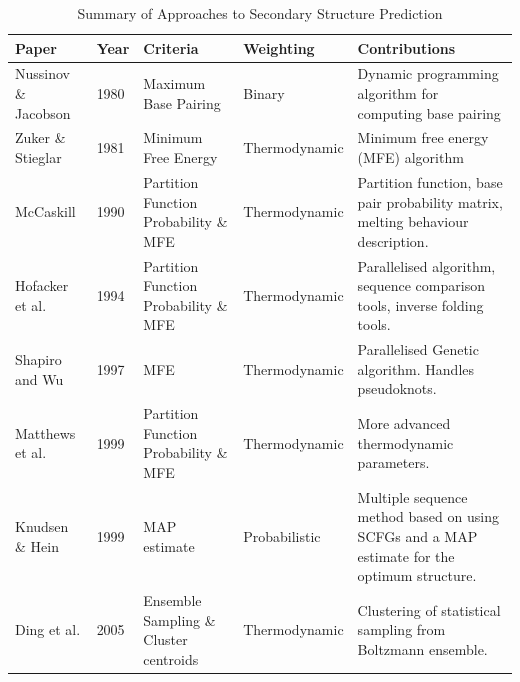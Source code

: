 \documentclass[journal]{IEEEtran}
\begin{document}
\begin{table}[t]
\centering
\caption{Summary of Approaches to Secondary Structure Prediction}
\label{my-label}
\begin{tabular}{|l|l|p{5cm}|l|p{5cm}|}
\hline
\textbf{Paper}                             & \textbf{Year} & \textbf{Criteria}                     & \textbf{Weighting} & \textbf{Contributions}                                                           \\ \hline
Nussinov \& Jacobson \cite{nussinov1980fast}           & 1980          & Maximum Base Pairing                  & Binary             & Dynamic programming algorithm for computing base pairing                                     \\ \hline
Zuker \& Stieglar \cite{zuker1981optimal} & 1981          & Minimum Free Energy                   & Thermodynamic      & Minimum free energy (MFE) algorithm                                                    \\ \hline
McCaskill \cite{mccaskill1990equilibrium}  & 1990          & Partition Function Probability \& MFE & Thermodynamic      & Partition function, base pair probability matrix, melting behaviour description. \\ \hline

Hofacker et al. \cite{hofacker1994fast}  & 1994          & Partition Function Probability \& MFE & Thermodynamic      & Parallelised algorithm, sequence comparison tools, inverse folding tools. \\ \hline

Shapiro and Wu \cite{shapiro1997predicting, shapiro1994massively} & 1997 & MFE & Thermodynamic & Parallelised Genetic algorithm. Handles pseudoknots. \\ \hline

Matthews et al. \cite{mathews1999expanded} & 1999          & Partition Function Probability \& MFE & Thermodynamic      & More advanced thermodynamic parameters. \\ \hline

Knudsen \& Hein \cite{knudsen1999rna, knudsen2003pfold} & 1999  & MAP estimate & Probabilistic & Multiple sequence method based on using SCFGs and a MAP estimate for the optimum structure. \\ \hline

Ding et al. \cite{ding2003statistical, ding2005rna} & 2005          & Ensemble Sampling \& Cluster centroids & Thermodynamic      & Clustering of statistical sampling from Boltzmann ensemble. \\ \hline


\end{tabular}
\end{table}
\end{document}
